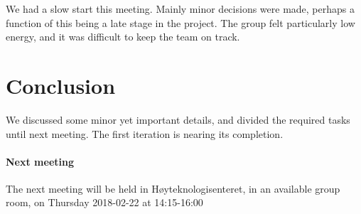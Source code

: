 \documentclass{article}
\begin{document}
We had a slow start this meeting. Mainly minor decisions were made, perhaps a function of this being a late stage in the project. The group felt particularly low energy, and it was difficult to keep the team on track.

\section{Conclusion}

We discussed some minor yet important details, and divided the required tasks until next meeting. The first iteration is nearing its completion.

\paragraph{Next meeting}

The next meeting will be held in Høyteknologisenteret, in an available group room, on Thursday 2018-02-22 at 14:15-16:00
\end{document}
